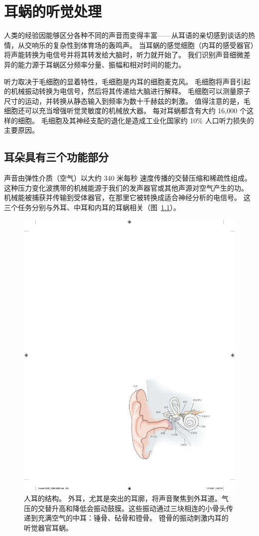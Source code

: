 \chapter{耳蜗的听觉处理} \label{chap:chap26}

人类的经验因能够区分各种不同的声音而变得丰富——从耳语的亲切感到谈话的热情，从交响乐的复杂性到体育场的轰鸣声。
当耳蜗的感觉细胞（内耳的感受器官）将声能转换为电信号并将其转发给大脑时，听力就开始了。
我们识别声音细微差异的能力源于耳蜗区分频率分量、振幅和相对时间的能力。


听力取决于毛细胞的显着特性，毛细胞是内耳的细胞麦克风。
毛细胞将声音引起的机械振动转换为电信号，然后将其传递给大脑进行解释。
毛细胞可以测量原子尺寸的运动，并转换从静态输入到频率为数十千赫兹的刺激。
值得注意的是，毛细胞还可以充当增强听觉灵敏度的机械放大器。
每对耳蜗都含有大约 16,000 个这样的细胞。
毛细胞及其神经支配的退化是造成工业化国家约 10\% 人口听力损失的主要原因。



\section{耳朵具有三个功能部分}

声音由弹性介质（空气）以大约 340 米每秒 速度传播的交替压缩和稀疏性组成。
这种压力变化波携带的机械能源于我们的发声器官或其他声源对空气产生的功。
机械能被捕获并传输到受体器官，在那里它被转换成适合神经分析的电信号。
这三个任务分别与外耳、中耳和内耳的耳蜗相关（图~\ref{fig:26_1}）。


\begin{figure}[htbp]
	\centering
	\includegraphics[width=0.5\linewidth]{chap26/fig_26_1}
	\caption{人耳的结构。 
		外耳，尤其是突出的耳廓，将声音聚焦到外耳道。气压的交替升高和降低会振动鼓膜。这些振动通过三块相连的小骨头传递到充满空气的中耳：锤骨、砧骨和镫骨。 
		镫骨的振动刺激内耳的听觉器官耳蜗。}
	\label{fig:26_1}
\end{figure}


